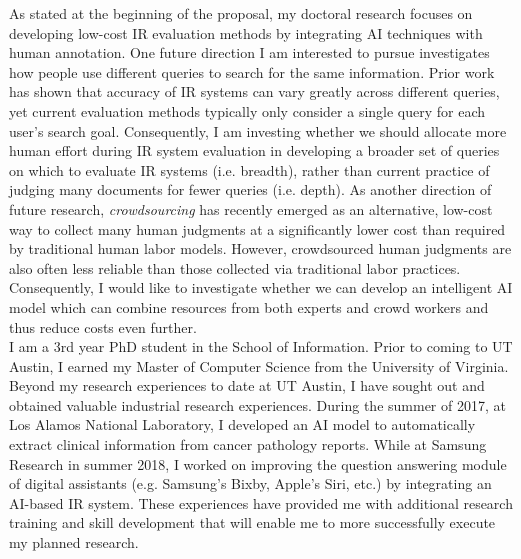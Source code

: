 \documentclass{article}
\begin{document}
 As stated at the beginning of the proposal, my doctoral research focuses on developing low-cost IR evaluation methods by integrating AI techniques with human annotation. %
One future direction I am interested to pursue investigates how people use different queries to search for the same information. Prior work has shown that
accuracy of IR systems can vary greatly across different queries, yet current evaluation methods typically only consider a single query for each user's search goal. Consequently, I am investing whether we should allocate more human effort during IR system evaluation in developing a broader set of queries on which to evaluate IR systems (i.e. breadth), rather than current practice of judging many documents for fewer queries (i.e. depth). As another direction of future research, {\it crowdsourcing} has recently emerged as an alternative, low-cost way to collect many human judgments at a significantly lower cost than required by traditional human labor models. However, crowdsourced human judgments are also often less reliable than those collected via traditional labor practices. Consequently, I would like to investigate whether we can develop an intelligent AI model which can combine resources from both experts and crowd workers and thus reduce costs even further.  \\



 I am a 3rd year PhD student in the School of Information. Prior to coming to UT Austin, I earned my Master of Computer Science from the University of Virginia.
Beyond my research experiences to date at UT Austin, I have sought out and obtained valuable industrial research experiences. During the summer of 2017, at Los Alamos National Laboratory, I developed an AI model to automatically extract clinical information from cancer pathology reports. While at Samsung Research in summer 2018, I worked on improving the question answering module of digital assistants (e.g. Samsung's Bixby, Apple's Siri, etc.)  by integrating an AI-based IR system. These experiences have provided me with additional research training and skill development that will enable me to more successfully execute my planned research. \\
\end{document}
